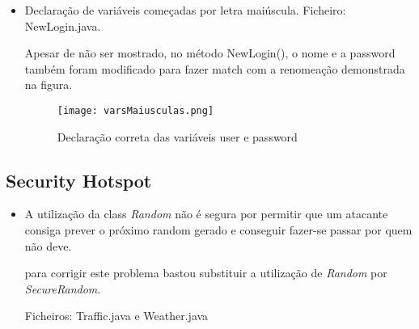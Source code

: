 \begin{itemize}
\item Declaração de variáveis começadas por letra maiúscula. \newline
 Ficheiro: NewLogin.java.\newline

\par Apesar de não ser mostrado, no método NewLogin(), o nome e a password também foram modificado para fazer match com a renomeação demonstrada na figura.

\begin{figure}[H]

  \centering

  \texttt{[image: varsMaiusculas.png]}

  \caption {Declaração correta das variáveis user e password}

  \label {fig26}

\end{figure}

\end{itemize}

\subsection{Security Hotspot}

\begin{itemize}

\item A utilização da class \textit{Random} não é segura por permitir que um atacante consiga prever o próximo random gerado e conseguir fazer-se passar por quem não deve.\newline

\par para corrigir este problema bastou substituir a utilização de \textit{Random} por \textit{SecureRandom}.

Ficheiros: Traffic.java e Weather.java

\end{itemize}


